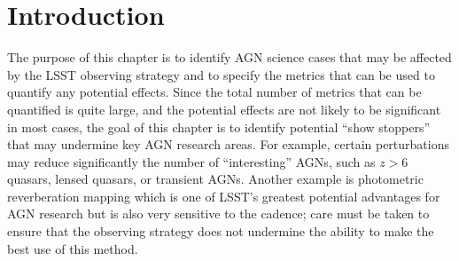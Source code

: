 
\section{Introduction}
\label{sec:\chpname:intro}


The purpose of this chapter is to identify AGN science cases that may be
affected by the LSST observing strategy and to specify the metrics that can be
used to quantify any potential effects. Since the total number of metrics that
can be quantified is quite large, and the potential effects are not likely to be
significant in most cases, the goal of this chapter is to identify potential
``show stoppers'' that may undermine key AGN research areas. For example,
certain perturbations may reduce significantly the number of ``interesting'' AGNs,
such as $z > 6$ quasars, lensed quasars, or transient AGNs. Another example is
photometric reverberation mapping which is one of LSST's greatest potential
advantages for AGN research but is also very sensitive to the cadence; care must
be taken to ensure that the observing strategy does not undermine the ability to
make the best use of this method.


